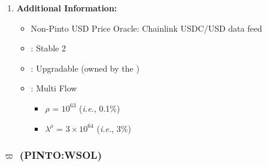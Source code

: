 \documentclass[class=article, crop=false]{standalone}
\begin{document}
\begin{enumerate}
    \item \textbf{Additional Information:}
        \begin{itemize}
            \item Non-Pinto USD Price Oracle: Chainlink USDC/USD data feed
            \item {}: Stable 2
            \item {}: Upgradable  (owned by the )
            \item {}: Multi Flow
                \begin{itemize}
                    \item $\rho$ = $10^{63}$ (\textit{i.e.}, 0.1\%)
                    \item $\lambda^{\rho}$ = $3 \times 10^{64}$ (\textit{i.e.}, 3\%)
                \end{itemize}
        \end{itemize}

\end{enumerate}


\subsubsection{$\varpi$ (PINTO:WSOL)}
\end{document}

